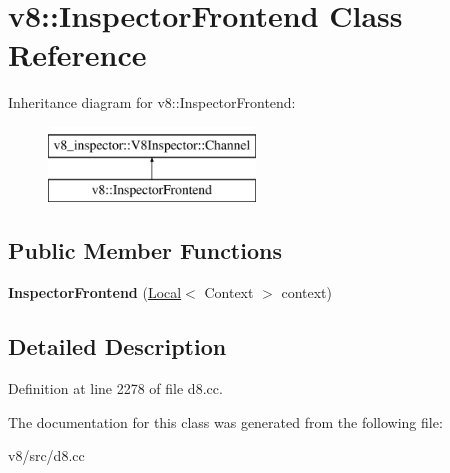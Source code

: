 \hypertarget{classv8_1_1InspectorFrontend}{}\section{v8\+:\+:Inspector\+Frontend Class Reference}
\label{classv8_1_1InspectorFrontend}
Inheritance diagram for v8\+:\+:Inspector\+Frontend\+:\begin{figure}[H]
\begin{center}
\leavevmode
\includegraphics[height=2.000000cm]{classv8_1_1InspectorFrontend}
\end{center}
\end{figure}
\subsection*{Public Member Functions}
\begin{DoxyCompactItemize}
\item 
\mbox{\label{classv8_1_1InspectorFrontend_af68f270ba7258b7bc072d9b8f1001262}} 
{\bfseries Inspector\+Frontend} (\mbox{\hyperlink{classv8_1_1Local}{Local}}$<$ Context $>$ context)
\end{DoxyCompactItemize}


\subsection{Detailed Description}


Definition at line 2278 of file d8.\+cc.



The documentation for this class was generated from the following file\+:\begin{DoxyCompactItemize}
\item 
v8/src/d8.\+cc\end{DoxyCompactItemize}

